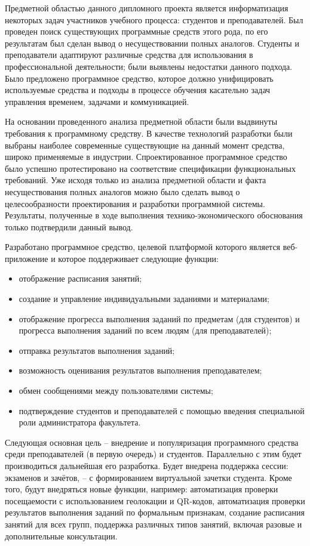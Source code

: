 
Предметной областью данного дипломного проекта является информатизация некоторых задач участников учебного процесса: студентов и преподавателей. Был проведен поиск существующих программные средств этого рода, по его результатам был сделан вывод о несуществовании полных аналогов. Студенты и преподаватели адаптируют различные средства для использования в профессиональной деятельности; были выявлены недостатки данного подхода. Было предложено программное средство, которое должно унифицировать используемые средства и подходы в процессе обучения касательно задач управления временем, задачами и коммуникацией. 

На основании проведенного анализа предметной области были выдвинуты требования к программному средству. В качестве технологий разработки были выбраны наиболее современные существующие на данный момент средства, широко применяемые в индустрии. Спроектированное программное средство было успешно протестировано на соответствие спецификации функциональных требований. Уже исходя только из анализа предметной области и факта несуществования полных аналогов можно было сделать вывод о целесообразности проектирования и разработки программной системы. Результаты, полученные в ходе выполнения технико-экономического обоснования только подтвердили данный вывод.

Разработано программное средство, целевой платформой которого является веб-приложение и которое поддерживает следующие функции:
\begin{itemize}
	\item отображение расписания занятий;
	\item создание и управление индивидуальными заданиями и материалами;
	\item отображение прогресса выполнения заданий по предметам (для студентов) и прогресса выполнения заданий по всем людям (для преподавателей);
	\item отправка результатов выполнения заданий;
	\item возможность оценивания результатов выполнения преподавателем;
	\item обмен сообщениями между пользователями системы;
	\item подтверждение студентов и преподавателей с помощью введения специальной роли администратора факультета.
\end{itemize}

Следующая основная цель -- внедрение и популяризация программного средства среди преподавателей (в первую очередь) и студентов. Параллельно с этим будет производиться дальнейшая его разработка. Будет внедрена поддержка сессии: экзаменов и зачётов, -- с формированием виртуальной зачетки студента. Кроме того, будут внедряться новые функции, например: автоматизация проверки посещаемости с использованием геолокации и QR-кодов, автоматизация проверки результатов выполнения заданий по формальным признакам, создание расписания занятий для всех групп, поддержка различных типов занятий, включая разовые и дополнительные консультации.

